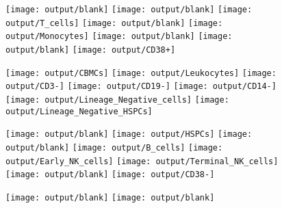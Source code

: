 \documentclass[11pt]{article}
\begin{document}
\begin{figure}[htbp]
\begin{minipage}[t]{0.125\textwidth}
    \centering
    \vspace{-0.333\linewidth} %
    \texttt{[image: output/blank]}
    \texttt{[image: output/blank]}
    \texttt{[image: output/T\_cells]}
    \texttt{[image: output/blank]}
    \texttt{[image: output/Monocytes]}
    \texttt{[image: output/blank]}
    \texttt{[image: output/blank]}
    \texttt{[image: output/CD38+]}
  \end{minipage}%
  \begin{minipage}[t]{0.125\textwidth}
    \centering
    \texttt{[image: output/CBMCs]}
    \texttt{[image: output/Leukocytes]}
    \texttt{[image: output/CD3-]}
    \texttt{[image: output/CD19-]}
    \texttt{[image: output/CD14-]}
    \texttt{[image: output/Lineage\_Negative\_cells]}
    \texttt{[image: output/Lineage\_Negative\_HSPCs]}
  \end{minipage}%
  \begin{minipage}[t]{0.125\textwidth}
    \centering
    \vspace{-0.333\linewidth} %
    \texttt{[image: output/blank]}
    \texttt{[image: output/HSPCs]}
    \texttt{[image: output/blank]}
    \texttt{[image: output/B\_cells]}
    \texttt{[image: output/Early\_NK\_cells]}
    \texttt{[image: output/Terminal\_NK\_cells]}
    \texttt{[image: output/blank]}
    \texttt{[image: output/CD38-]}
  \end{minipage}%
  \begin{minipage}[t]{0.125\textwidth}
    \centering
    \texttt{[image: output/blank]}
    \texttt{[image: output/blank]}

\end{minipage}
\end{figure}
\end{document}
